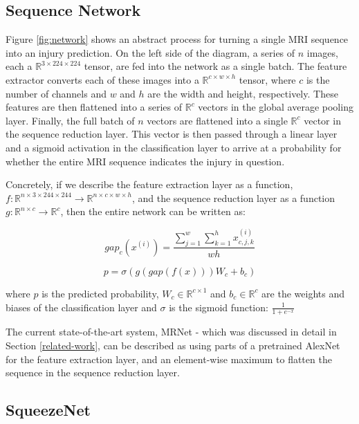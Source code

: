 \documentclass[10pt,twocolumn,letterpaper]{article}
\begin{document}
\subsection{Sequence Network}

Figure \ref{fig:network} shows an abstract process for turning a single MRI sequence into an injury prediction. On the left side of the diagram, a series of $n$ images, each a $\mathbb{R}^{3 \times 224 \times 224}$ tensor, are fed into the network as a single batch. The feature extractor converts each of these images into a $\mathbb{R}^{c \times w \times h}$ tensor, where $c$ is the number of channels and $w$ and $h$ are the width and height, respectively. These features are then flattened into a series of $\mathbb{R}^c$ vectors in the global average pooling layer. Finally, the full batch of $n$ vectors are flattened into a single $\mathbb{R}^c$ vector in the sequence reduction layer. This vector is then passed through a linear layer and a sigmoid activation in the classification layer to arrive at a probability for whether the entire MRI sequence indicates the injury in question.

Concretely, if we describe the feature extraction layer as a function, $f: \mathbb{R}^{n \times 3 \times 244 \times 244} \rightarrow \mathbb{R}^{n \times c \times w \times h}$, and the sequence reduction layer as a function $g: \mathbb{R}^{n \times c} \rightarrow \mathbb{R}^c$, then the entire network can be written as:

$$ gap_c(x^{(i)}) = \frac{\sum_{j=1}^w \sum_{k=1}^h x_{c,j,k}^{(i)}}{wh} $$

\begin{equation}
\label{eq:network}
p = \sigma(g(gap(f(x))) W_c + b_c)
\end{equation}

where $p$ is the predicted probability, $W_c \in \mathbb{R}^{c \times 1}$ and $b_c \in \mathbb{R}^c$ are the weights and biases of the classification layer and $\sigma$ is the sigmoid function: $\frac{1}{1 + e^{-x}}$

The current state-of-the-art system, MRNet - which was discussed in detail in Section \ref{related-work}, can be described as using parts of a pretrained AlexNet for the feature extraction layer, and an element-wise maximum to flatten the sequence in the sequence reduction layer.

\subsection{SqueezeNet}
\end{document}
